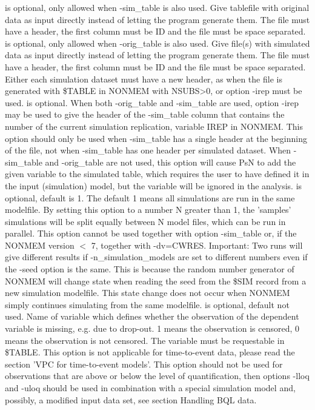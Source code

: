 \begin{optionlist}
\nextopt
{}
is optional, only allowed when -sim\_table is also used. Give tablefile with original data as input directly instead of letting the program generate them. The file must have a header, the first column must be ID and the file must be space separated.
\nextopt
{}
is optional, only allowed when -orig\_table is also used. Give file(s) with simulated data as input directly instead of letting the program generate them.  The file must have a header, the first column must be ID and the file must be space separated. 
Either each simulation dataset must have a new header, as when the file is generated with \$TABLE in NONMEM with NSUBS>0, or option -irep must be used.
\nextopt
{}
is optional. When both -orig\_table and -sim\_table are used, option -irep may be used to give the header of the -sim\_table column 
that contains the number of the current simulation replication, variable IREP in NONMEM. This option should only be used
when -sim\_table has a single header at the beginning of the file, not when -sim\_table has one header per simulated dataset.
When -sim\_table and -orig\_table are not used, this option will cause PsN to add the given variable to the simulated table,
which requires the user to have defined it in the input (simulation) model,
but the variable will be ignored in the analysis.
\nextopt
{}
is optional, default is 1. The default 1 means all simulations are run in the same modelfile. By setting this option to a number N greater than 1, the 'samples' simulations will be split equally between N model files, which can be run in parallel. This option cannot be used together with option \mbox{-sim\_table} or, if the NONMEM version $<$ 7, together with -dv=CWRES. Important: Two runs will give different results if -n\_simulation\_models are set to different numbers even if the -seed option is the same. This is because the random number generator of NONMEM will change state when reading the seed from the \$SIM record from a new simulation modelfile. This state change does not occur when NONMEM simply continues simulating from the same modelfile. 
\nextopt
{}
is optional, default not used. Name of variable which defines whether the observation of the dependent variable is missing, e.g. due to drop-out. 1 means the observation is censored, 0 means the observation is not censored. The variable must be requestable in \$TABLE. This option is not applicable for time-to-event data, please read the section 'VPC for time-to-event models'. This option should not be used for observations that are above or below the level of quantification, then options \mbox{-lloq} and -uloq should be used in combination with a special simulation model and, possibly, a modified input data set, see section Handling BQL data.  

\end{optionlist}
